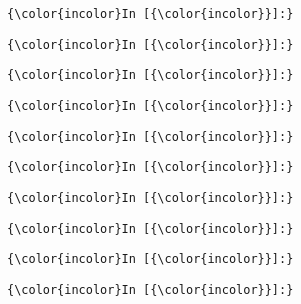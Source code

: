\documentclass{article}
\begin{document}
    \begin{Verbatim}[commandchars=\\\{\}]
{\color{incolor}In [{\color{incolor}}]:} 
\end{Verbatim}

    \begin{Verbatim}[commandchars=\\\{\}]
{\color{incolor}In [{\color{incolor}}]:} 
\end{Verbatim}

    \begin{Verbatim}[commandchars=\\\{\}]
{\color{incolor}In [{\color{incolor}}]:} 
\end{Verbatim}

    \begin{Verbatim}[commandchars=\\\{\}]
{\color{incolor}In [{\color{incolor}}]:} 
\end{Verbatim}

    \begin{Verbatim}[commandchars=\\\{\}]
{\color{incolor}In [{\color{incolor}}]:} 
\end{Verbatim}

    \begin{Verbatim}[commandchars=\\\{\}]
{\color{incolor}In [{\color{incolor}}]:} 
\end{Verbatim}

    \begin{Verbatim}[commandchars=\\\{\}]
{\color{incolor}In [{\color{incolor}}]:} 
\end{Verbatim}

    \begin{Verbatim}[commandchars=\\\{\}]
{\color{incolor}In [{\color{incolor}}]:} 
\end{Verbatim}

    \begin{Verbatim}[commandchars=\\\{\}]
{\color{incolor}In [{\color{incolor}}]:} 
\end{Verbatim}

    \begin{Verbatim}[commandchars=\\\{\}]
{\color{incolor}In [{\color{incolor}}]:} 
\end{Verbatim}
\end{document}

